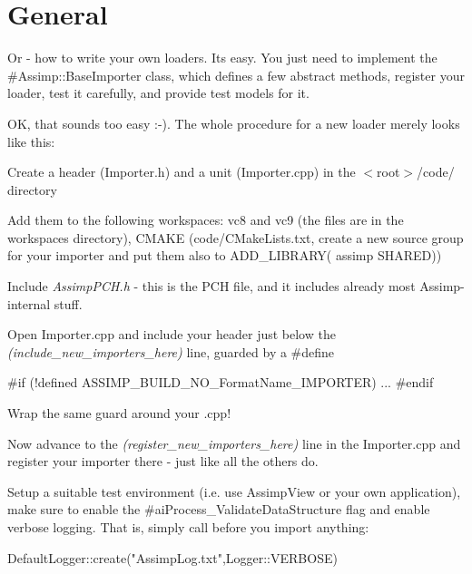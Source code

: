 \hypertarget{materials_General}{}\section{General}\label{materials_General}
Or -\/ how to write your own loaders. It\textquotesingle{}s easy. You just need to implement the \#\+Assimp\+::\+Base\+Importer class, which defines a few abstract methods, register your loader, test it carefully, and provide test models for it.

O\+K, that sounds too easy \+:-\/). The whole procedure for a new loader merely looks like this\+:


\begin{DoxyItemize}
\item Create a header ({Importer.\+h}) and a unit ({Importer.\+cpp}) in the {\ttfamily $<$root$>$/code/} directory 
\item Add them to the following workspaces\+: vc8 and vc9 (the files are in the workspaces directory), C\+M\+A\+K\+E (code/\+C\+Make\+Lists.\+txt, create a new source group for your importer and put them also to A\+D\+D\+\_\+\+L\+I\+B\+R\+A\+R\+Y( assimp S\+H\+A\+R\+E\+D)) 
\item Include {\itshape Assimp\+P\+C\+H.\+h} -\/ this is the P\+C\+H file, and it includes already most Assimp-\/internal stuff.  
\item Open Importer.\+cpp and include your header just below the {\itshape (include\+\_\+new\+\_\+importers\+\_\+here)} line, guarded by a \#define 
\begin{DoxyCode}
\textcolor{preprocessor}{#if (!defined ASSIMP\_BUILD\_NO\_FormatName\_IMPORTER)}
    ...
#endif
\end{DoxyCode}
 Wrap the same guard around your .cpp!


\item Now advance to the {\itshape (register\+\_\+new\+\_\+importers\+\_\+here)} line in the Importer.\+cpp and register your importer there -\/ just like all the others do. 
\item Setup a suitable test environment (i.\+e. use Assimp\+View or your own application), make sure to enable the \#ai\+Process\+\_\+\+Validate\+Data\+Structure flag and enable verbose logging. That is, simply call before you import anything\+: 
\begin{DoxyCode}
DefaultLogger::create(\textcolor{stringliteral}{"AssimpLog.txt"},Logger::VERBOSE)
\end{DoxyCode}
  

\end{DoxyItemize}
